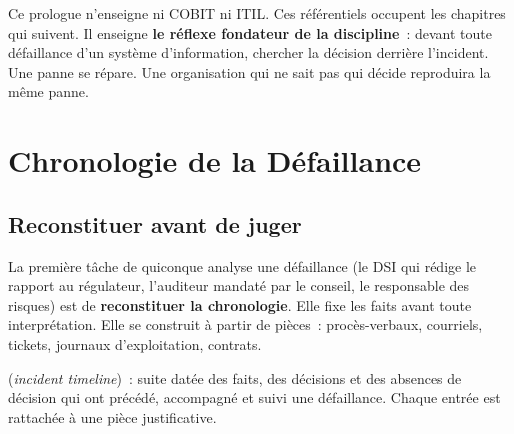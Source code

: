 Ce prologue n'enseigne ni COBIT ni ITIL. Ces référentiels occupent les
chapitres qui suivent. Il enseigne \textbf{le réflexe fondateur de la
discipline}~: devant toute défaillance d'un système d'information, chercher
la décision derrière l'incident. Une panne se répare. Une organisation qui
ne sait pas qui décide reproduira la même panne.

\separateur

\section{Chronologie de la Défaillance}
\label{sec:pro-chronologie}

\subsection{Reconstituer avant de juger}

La première tâche de quiconque analyse une défaillance (le DSI qui rédige le
rapport au régulateur, l'auditeur mandaté par le conseil, le responsable des
risques) est de \textbf{reconstituer la chronologie}. Elle fixe les faits
avant toute interprétation. Elle se construit à partir de pièces~:
procès-verbaux, courriels, tickets, journaux d'exploitation, contrats.

\begin{boxdef}
(\textit{incident timeline})~: suite datée des faits, des décisions et des
absences de décision qui ont précédé, accompagné et suivi une défaillance.
Chaque entrée est rattachée à une pièce justificative.
\end{boxdef}

